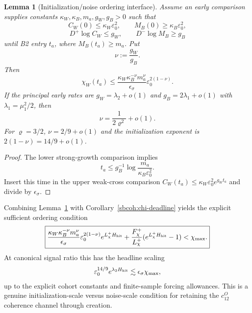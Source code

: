 \documentclass{article} %
\theoremstyle{plain}
\newtheorem{lemma}[theorem]{Lemma}
\theoremstyle{definition}
\theoremstyle{remark}
\begin{document}
\begin{lemma}[Initialization/noise ordering interface]
\label{sbcoh:init-noise}
Assume an early comparison supplies constants
$\kappa_W,\kappa_B,m_a,g_W,g_B>0$ such that
\[
 C_W(0)\le\kappa_W\varepsilon_0^2,
 \qquad
 M_B(0)\ge\kappa_B\varepsilon_0^2,
\]
\[
 D^+\log C_W\le g_W,
 \qquad
 D^-\log M_B\ge g_B
\]
until B2 entry $t_a$, where $M_B(t_a)\ge m_a$.  Put
\[
 \nu:=\frac{g_W}{g_B}.
\]
Then
\begin{equation}\label{sbcoh:init-chi}
 \boxed{
 \chi_W(t_a)
 \le
 \frac{\kappa_W\kappa_B^{-\nu}m_a^\nu}{\epsilon_\sigma}
 \varepsilon_0^{2(1-\nu)}.
 }
\end{equation}
If the principal early rates are
$g_W=\lambda_2+o(1)$ and $g_B=2\lambda_1+o(1)$ with
$\lambda_1=\mu_1^2/2$, then
\[
 \nu=\frac1{2\varrho^2}+o(1).
\]
For $\varrho=3/2$, $\nu=2/9+o(1)$ and the initialization exponent is
$2(1-\nu)=14/9+o(1)$.
\end{lemma}

\begin{proof}
The lower strong-growth comparison implies
\[
 t_a\le g_B^{-1}\log\frac{m_a}{\kappa_B\varepsilon_0^2}.
\]
Insert this time in the upper weak-cross comparison
$C_W(t_a)\le\kappa_W\varepsilon_0^2e^{g_Wt_a}$ and divide by
$\epsilon_\sigma$.
\end{proof}

Combining Lemma~\ref{sbcoh:init-noise} with
Corollary~\ref{sbcoh:chi-deadline} yields the explicit sufficient ordering
condition
\begin{equation}\label{sbcoh:init-noise-hit}
 \boxed{
 \frac{\kappa_W\kappa_B^{-\nu}m_a^\nu}{\epsilon_\sigma}
 \varepsilon_0^{2(1-\nu)}e^{L_\chi^+H_{\rm hit}}
 +\frac{F_\chi^+}{L_\chi^+}(e^{L_\chi^+H_{\rm hit}}-1)
 <\chi_{\max}.
 }
\end{equation}
At canonical signal ratio this has the headline scaling
\[
 \varepsilon_0^{14/9}e^{\lambda_2H_{\rm hit}}
 \lesssim \epsilon_\sigma\chi_{\max},
\]
up to the explicit cohort constants and finite-sample forcing allowances.
This is a genuine initialization-scale versus noise-scale condition for
retaining the $c_{12}^O$ coherence channel through creation.
\end{document}
